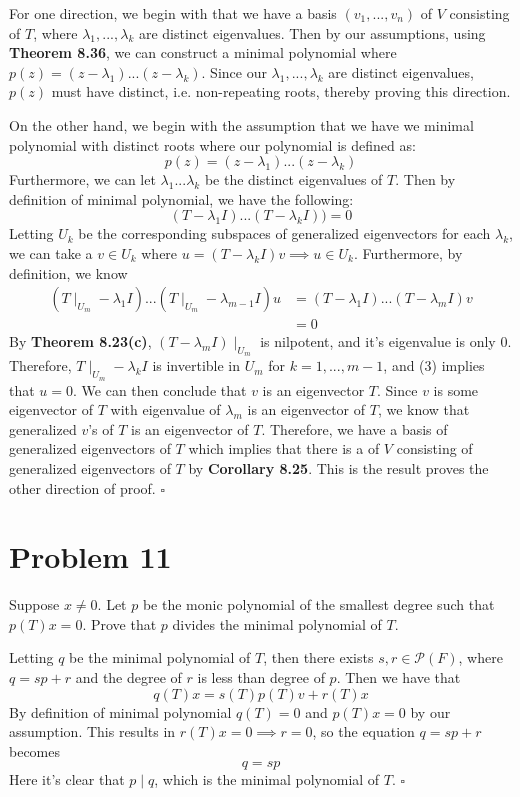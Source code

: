 \documentclass[12pt]{article}
\newenvironment{proof}{\noindent{\bf Proof.}}{\hfill $\square$\medskip}
\begin{document}
\begin{proof}
For one direction, we begin with that we have a basis $(v_{1},...,v_{n})$ of $V$ consisting of $T$, where  $\lambda_{1},...,\lambda_{k}$ are distinct eigenvalues. Then by our assumptions, using \textbf{Theorem 8.36}, we can construct a minimal polynomial where $p(z)=(z-\lambda_{1})...(z-\lambda_{k})$. Since our $\lambda_{1},...,\lambda_{k}$ are distinct eigenvalues, $p(z)$ must have distinct, i.e. non-repeating roots, thereby proving this direction.

On the other hand, we begin with the assumption that we have we minimal polynomial with distinct roots where our polynomial is defined as:
$$p(z)=(z-\lambda_{1})...(z-\lambda_{k})$$
Furthermore, we can let $\lambda_{1}...\lambda_{k}$ be the distinct eigenvalues of $T$. Then by definition of minimal polynomial, we have the following:
$$(T-\lambda_{1}I)...(T-\lambda_{k}I))=0$$
Letting $U_{k}$ be the corresponding subspaces of generalized eigenvectors for each $\lambda_{k}$, we can take a $v\in U_{k}$ where $u=(T-\lambda_{k}I)v\implies u\in U_{k}$. Furthermore, by definition, we know
\begin{equation}
\begin{split}
(T\mid_{U_{m}}-\lambda_{1}I)...(T\mid_{U_{m}}-\lambda_{m-1}I)u&=(T-\lambda_{1}I)...(T-\lambda_{m}I)v\\
&=0
\end{split}    
\end{equation}
By \textbf{Theorem 8.23(c)}, $(T-\lambda_{m}I)\mid_{U_{m}}$ is nilpotent, and it's eigenvalue is only $0$. Therefore, $T\mid_{U_{m}}-\lambda_{k}I$ is invertible in $U_{m}$ for $k=1,...,m-1$, and (3) implies that $u=0$. We can then conclude that $v$ is an eigenvector $T$. Since $v$ is some eigenvector of $T$ with eigenvalue of $\lambda_{m}$ is an eigenvector of $T$, we know that generalized $v$'s of $T$ is an eigenvector of $T$. Therefore, we have a basis of generalized eigenvectors of $T$ which implies that there is a of $V$ consisting of generalized eigenvectors of $T$ by \textbf{Corollary 8.25}. This is the result proves the other direction of proof.
\end{proof}


\newpage
\section{Problem 11}
Suppose $x\neq 0$. Let $p$ be the monic polynomial of the smallest degree such that $p(T)x=0$. Prove that $p$ divides the minimal polynomial of $T$.

\begin{proof}
Letting $q$ be the minimal polynomial of $T$, then there exists $s,r\in \mathcal{P}(F)$, where $q=sp+r$ and the degree of $r$ is less than degree of $p$. Then we have that
$$q(T)x=s(T)p(T)v+r(T)x$$
By definition of minimal polynomial $q(T)=0$ and $p(T)x=0$ by our assumption. This results in $r(T)x=0\implies r=0$, so the equation $q=sp+r$ becomes
$$q=sp$$
Here it's clear that $p\mid q$, which is the minimal polynomial of $T$.
\end{proof}
\end{document}
